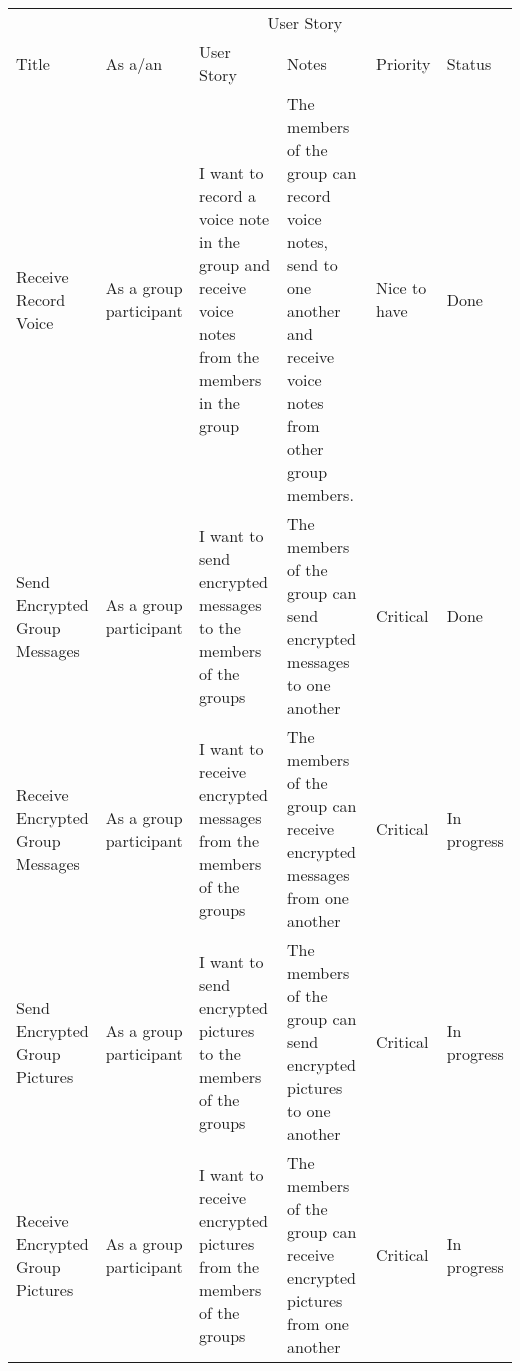 \documentclass[a4paper]{article}
\begin{document}
\begin{table}[H] 
\begin{tabular}{p{2cm} p{2.5cm} p{3cm} p{3cm} p{1cm} p{0.75cm}} %
\hline %
& \multicolumn{5}{c}{User Story} \\ %
\cmidrule(l){2-6} %
Title & As a/an & User Story & Notes & Priority & Status\\ %
\hline %

Receive Record Voice & As a group participant & I want to record a voice note in the group and receive voice notes from the members in the group & The members of the group can record voice notes, send to one another and receive voice notes from other group members. & Nice to have & Done\\ \cmidrule(l){2-6}%

Send Encrypted Group Messages & As a group participant & I want to send encrypted messages to the members of the groups & The members of the group can send encrypted messages to one another & Critical & Done\\ \cmidrule(l){2-6}%

Receive Encrypted Group Messages & As a group participant & I want to receive encrypted messages from the members of the groups & The members of the group can receive encrypted messages from one another & Critical & In progress\\ \cmidrule(l){2-6}%

Send Encrypted Group Pictures & As a group participant & I want to send encrypted pictures to the members of the groups & The members of the group can send encrypted pictures to one another & Critical & In progress\\ \cmidrule(l){2-6} %

Receive Encrypted Group Pictures & As a group participant & I want to receive encrypted pictures from the members of the groups & The members of the group can receive encrypted pictures from one another & Critical & In progress\\ \cmidrule(l){2-6} %


\end{tabular}
\end{table}
\end{document}
